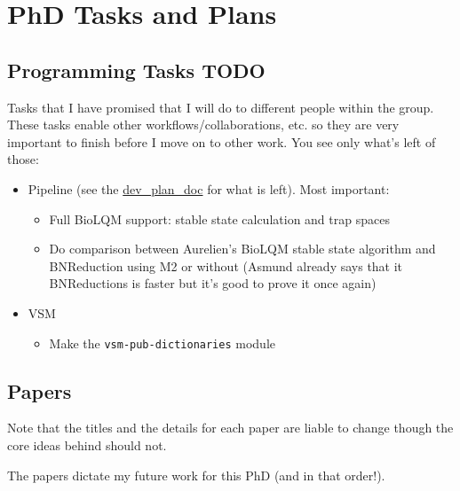\documentclass[
  12pt,
]{book}
\providecommand{\tightlist}{%
  \setlength{\itemsep}{0pt}\setlength{\parskip}{0pt}}
\begin{document}
\hypertarget{plans}{%
\chapter{PhD Tasks and Plans}\label{plans}}

\hypertarget{programming-tasks-todo}{%
\section{Programming Tasks TODO}\label{programming-tasks-todo}}

Tasks that I have promised that I will do to different people within the group.
These tasks enable other workflows/collaborations, etc. so they are very
important to finish before I move on to other work. You see only what's left of
those:

\begin{itemize}
\tightlist
\item
  Pipeline (see the \href{https://docs.google.com/document/d/1OUupR0b-28YB9pVAww77RMecnFN6A39MYjXMjljmvG4/edit?usp=sharing}{dev\_plan\_doc} for what is left). Most important:

  \begin{itemize}
  \tightlist
  \item
    Full BioLQM support: stable state calculation and trap spaces
  \item
    Do comparison between Aurelien's BioLQM stable state algorithm and
    BNReduction using M2 or without (Asmund already says that it BNReductions is faster
    but it's good to prove it once again)
  \end{itemize}
\item
  VSM

  \begin{itemize}
  \tightlist
  \item
    Make the \texttt{vsm-pub-dictionaries} module
  \end{itemize}
\end{itemize}

\hypertarget{papers}{%
\section{Papers}\label{papers}}

Note that the titles and the details for each paper are liable to change though the core ideas behind should not.

The papers dictate my future work for this PhD (and in that order!).
\end{document}
